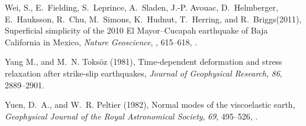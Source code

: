 \documentclass[draft,linenumbers]{AGUJournal}
\providecommand{\DIFadd}[1]{{\protect\color{blue}\uwave{#1}}} %
\providecommand{\DIFaddbegin}{} %
\providecommand{\DIFaddend}{} %
\providecommand{\DIFdelbegin}{} %
\providecommand{\DIFdelend}{} %
\begin{document}
\begin{thebibliography}{52}
Wei, S., E.~Fielding, S.~Leprince, A.~Sladen, J.-P. Avouac, D.~Helmberger, E.~Hauksson, R.~Chu, M.~Simons, K.~Hudnut, T.~Herring, and R.~Briggs\DIFaddbegin \DIFadd{,}\DIFaddend (2011{}), {Superficial simplicity of the 2010 El Mayor–Cucapah earthquake of Baja California in Mexico}, \textit{Nature Geoscience}, \DIFdelbegin %
\DIFdelend \DIFaddbegin \textit{\DIFadd{4}}\DIFaddend , 615--618, .

Yang M., and M.~N. Toks\"oz (1981), {Time-dependent deformation and stress relaxation after strike-slip earthquakes}, \textit{Journal of Geophysical Research}, \textit{86}, 2889--2901.

Yuen, D.~A., and W.~R. Peltier (1982), {Normal modes of the viscoelastic earth}, \textit{Geophysical Journal of the Royal Astronomical Society}, \textit{69}, 495--526, .

\end{thebibliography}
\DIFdelbegin %


\DIFdelend 

\listofchanges
\end{document}

